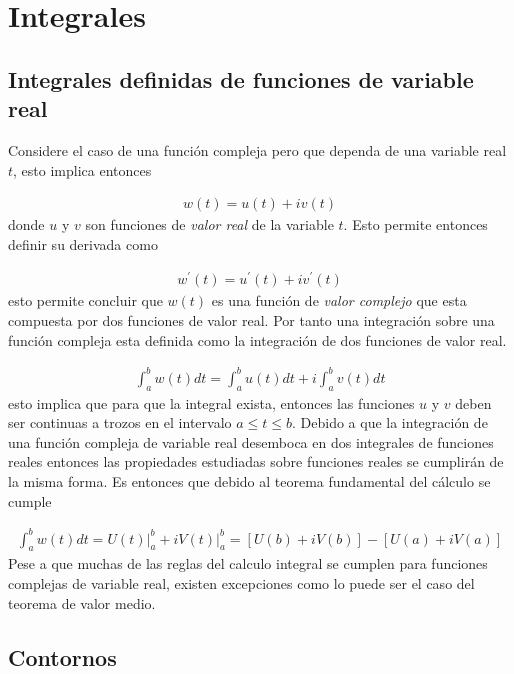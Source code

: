 \section{Integrales}

\subsection{Integrales definidas de funciones de variable real}

Considere el caso de una función compleja pero que dependa de una variable real $t$, esto implica entonces 

\begin{gather}
    w(t) = u(t) + iv(t)
\end{gather}
donde $u$ y $v$ son funciones de \textit{valor real} de la variable $t$. Esto permite entonces definir su derivada como 

\begin{gather}
    w^{\prime}(t) = u^{\prime}(t) + iv^{\prime}(t)
\end{gather}
esto permite concluir que $w(t)$ es una función de \textit{valor complejo} que esta compuesta por dos funciones de valor real. Por tanto una integración sobre una función compleja esta definida como la integración de dos funciones de valor real.

\begin{gather}
    \int_{a}^{b}w(t)dt = \int_{a}^{b}u(t)dt + i\int_{a}^{b}v(t)dt
\end{gather}
esto implica que para que la integral exista, entonces las funciones $u$ y $v$ deben ser continuas a trozos en el intervalo $a \leq t \leq b$. Debido a que la integración de una función compleja de variable real desemboca en dos integrales de funciones reales entonces las propiedades estudiadas sobre funciones reales se cumplirán de la misma forma. Es entonces que debido al teorema fundamental del cálculo se cumple 

\begin{gather}
    \int_{a}^{b}w(t)dt =  \left.U(t)\right|_a^{b} + iV(t)|_a^{b} = [U(b) + iV(b)] - [U(a) + iV(a)]
\end{gather}
Pese a que muchas de las reglas del calculo integral se cumplen para funciones complejas de variable real, existen excepciones como lo puede ser el caso del teorema de valor medio. 

\subsection{Contornos}

